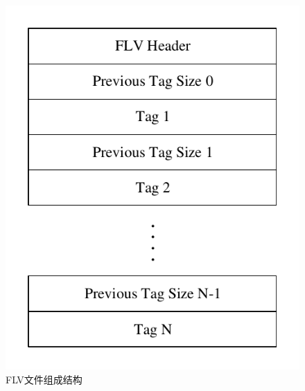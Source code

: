 \begin{figure}[ht]
    \centering
    \includegraphics[scale=1]{./Figure/IMG_flv_file.pdf}
    \caption{FLV文件组成结构}
    \label{Fig:flv_file}
\end{figure}




